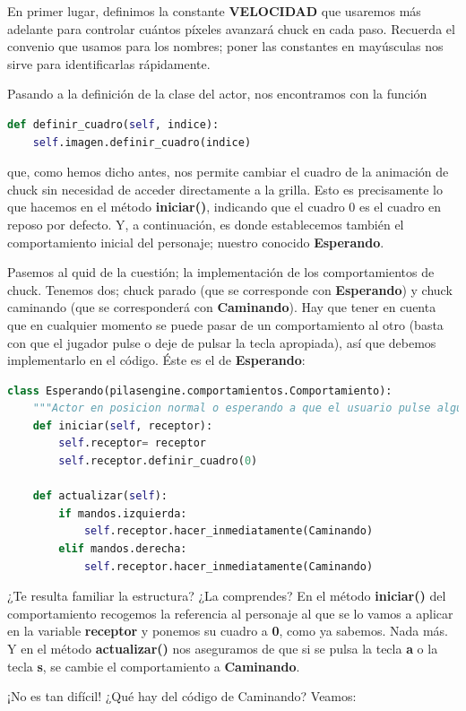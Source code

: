 \documentclass{article}
\begin{document}
En primer lugar, definimos la constante \textbf{VELOCIDAD} que usaremos más adelante para controlar cuántos píxeles avanzará chuck en cada paso. Recuerda el convenio que usamos para los nombres; poner las constantes en mayúsculas nos sirve para identificarlas rápidamente.\par
Pasando a la definición de la clase del actor, nos encontramos con la función\par

\begin{lstlisting}[language=Python]
def definir_cuadro(self, indice):
    self.imagen.definir_cuadro(indice)
\end{lstlisting}
\vspace{\baselineskip}

que, como hemos dicho antes, nos permite cambiar el cuadro de la animación de chuck sin necesidad de acceder directamente a la grilla. Esto es precisamente lo que hacemos en el método \textbf{iniciar()}, indicando que el cuadro 0 es el cuadro en reposo por defecto. Y, a continuación, es donde establecemos también el comportamiento inicial del personaje; nuestro conocido \textbf{Esperando}.\par
Pasemos al quid de la cuestión; la implementación de los comportamientos de chuck. Tenemos dos; chuck parado (que se corresponde con \textbf{Esperando}) y chuck caminando (que se corresponderá con \textbf{Caminando}). Hay que tener en cuenta que en cualquier momento se puede pasar de un comportamiento al otro (basta con que el jugador pulse o deje de pulsar la tecla apropiada), así que debemos implementarlo en el código. Éste es el de \textbf{Esperando}:\par

\begin{lstlisting}[language=Python]
class Esperando(pilasengine.comportamientos.Comportamiento):
    """Actor en posicion normal o esperando a que el usuario pulse alguna tecla"""
    def iniciar(self, receptor):
        self.receptor= receptor
        self.receptor.definir_cuadro(0)

    def actualizar(self):
        if mandos.izquierda:
            self.receptor.hacer_inmediatamente(Caminando)
        elif mandos.derecha:
            self.receptor.hacer_inmediatamente(Caminando)
\end{lstlisting}
\vspace{\baselineskip}

¿Te resulta familiar la estructura? ¿La comprendes? En el método \textbf{iniciar()} del
comportamiento recogemos la referencia al personaje al que se lo vamos a aplicar en la
variable \textbf{receptor} y ponemos su cuadro a \textbf{0}, como ya sabemos. Nada más. Y en el método
\textbf{actualizar()} nos aseguramos de que si se pulsa la tecla \textbf{a} o la tecla \textbf{s}, se cambie el
comportamiento a \textbf{Caminando}.\par
¡No es tan difícil! ¿Qué hay del código de Caminando? Veamos:
\end{document}
